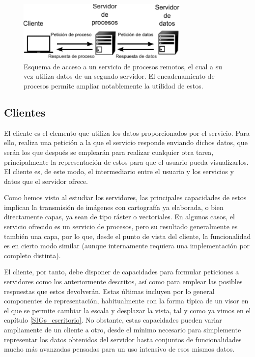 \begin{itemize}
\begin{figure}[!hbt]   
\centering
\includegraphics[width=0.75\textwidth]{Cliente_servidor/Datos_y_procesos_remotos.pdf}
\caption{\small Esquema de acceso a un servicio de procesos remotos, el cual a su vez utiliza datos de un segundo servidor. El encadenamiento de procesos permite ampliar notablemente la utilidad de estos.}
\label{Fig:Datos_y_procesos_remotos} 
\end{figure}

\end{itemize}

\subsection{Clientes}

El cliente es el elemento que utiliza los datos proporcionados por el servicio. Para ello, realiza una petición a la que el servicio responde enviando dichos datos, que serán los que después se emplearán para realizar cualquier otra tarea, principalmente la representación de estos para que el usuario pueda visualizarlos. El cliente es, de este modo, el intermediario entre el usuario y los servicios y datos que el servidor ofrece.

Como hemos visto al estudiar los servidores, las principales capacidades de estos implican la transmisión de imágenes con cartografía ya elaborada, o bien directamente capas, ya sean de tipo ráster o vectoriales. En algunos casos, el servicio ofrecido es un servicio de procesos, pero su resultado generalmente es también una capa, por lo que, desde el punto de vista del cliente, la funcionalidad es en cierto modo similar (aunque internamente requiera una implementación por completo distinta).

El cliente, por tanto, debe disponer de capacidades para formular peticiones a servidores como los anteriormente descritos, así como para emplear las posibles respuestas que estos devolverán. Estas últimas incluyen por lo general componentes de representación, habitualmente con la forma típica de un visor en el que se permite cambiar la escala y desplazar la vista, tal y como ya vimos en el capítulo \ref{SIGs_escritorio}. No obstante, estas capacidades pueden variar ampliamente de un cliente a otro, desde el mínimo necesario para simplemente representar los datos obtenidos del servidor hasta conjuntos de funcionalidades mucho más avanzadas pensadas para un uso intensivo de esos mismos datos.

